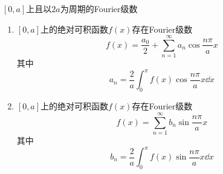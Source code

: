 \documentclass[lang = cn, scheme = chinese, thmcnt = section]{elegantbook}
\begin{document}
\begin{theorem}{$[0,a]$上且以$2a$为周期的Fourier级数}
	\begin{enumerate}
		\item $[0,a]$上的绝对可积函数$f(x)$存在Fourier级数
		$$
		f(x)=\frac{a_0}{2}+\sum_{n=1}^{\infty}a_n\cos \frac{n\pi}{a}x
		$$
		其中%
		$$
		a_n=\frac{2}{a}\int_{0}^{\pi}f(x)\cos \frac{n\pi}{a} x\dd x
		$$
		\item $[0,a]$上的绝对可积函数$f(x)$存在Fourier级数
		$$
		f(x)=\sum_{n=1}^{\infty}b_n\sin \frac{n\pi}{a}x
		$$
		其中%
		$$
		b_n=\frac{2}{a}\int_{0}^{\pi}f(x)\sin \frac{n\pi}{a} x\dd x
		$$
	\end{enumerate}
\end{theorem}
\end{document}
